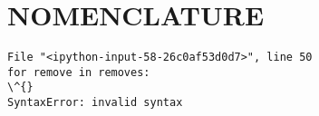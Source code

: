 \section*{NOMENCLATURE}\label{nomenclature}
\begin{Verbatim}[commandchars=\\\{\}]
File "<ipython-input-58-26c0af53d0d7>", line 50
for remove in removes:
\^{}
SyntaxError: invalid syntax
\end{Verbatim}
